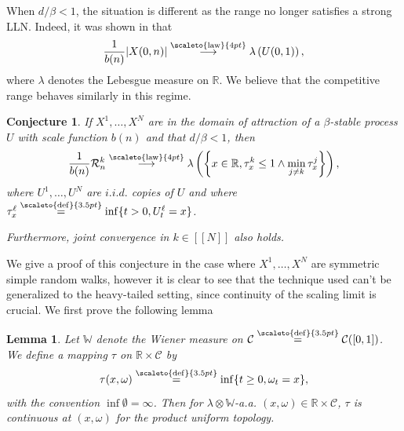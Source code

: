 \documentclass[12pt]{article}
\newcommand{\RR}{\mathbb R}
\newcommand{\R}{\mathcal R}
\newcommand{\1}{\mathds{1}}
\newcommand{\distribution}{\stackrel{\scaleto{\mathrm{law}}{4pt}}{\longrightarrow}}
\newcommand{\eqdef}{\stackrel{\scaleto{\mathrm{def}}{3.5pt}}{=}}
\newtheorem{lemma}{Lemma}
\newtheorem{conjecture}{Conjecture}
\numberwithin{equation}{section}
\begin{document}
When $d/\beta<1$, the situation is different as the range no longer satisfies a strong LLN. Indeed, it was shown in \cite{LeGallRosenRangeOfStableRandomWalks1991} that
\begin{equation*}
    \frac{1}{b(n)}|X(0,n)|\distribution\lambda\left(U(0,1)\right),
\end{equation*}
where $\lambda$ denotes the Lebesgue measure on $\RR$. We believe that the competitive range behaves similarly in this regime.
\begin{conjecture}
    If $X^1,\dots,X^N$ are in the domain of attraction of a $\beta$-stable process $U$ with scale function $b(n)$ and that $d/\beta<1$, then 
    \begin{equation*}
        \frac{1}{b(n)}\R_n^k\distribution\lambda\left(\left\{x\in\RR, \tau_x^k\le 1\wedge\min_{j\ne k}\tau_x^j\right\}\right),
    \end{equation*}
    where $U^1,\dots,U^N$ are $i.i.d.$ copies of $U$ and where $\tau_x^\ell\eqdef\inf\{t>0, U_t^\ell=x\}$.

    Furthermore, joint convergence in $k\in[\![N]\!]$ also holds.
\end{conjecture}
We give a proof of this conjecture in the case where $X^1,\dots,X^N$ are symmetric simple random walks, however it is clear to see that the technique used can't be generalized to the heavy-tailed setting, since continuity of the scaling limit is crucial. We first prove the following lemma 

\begin{lemma}
\label{lemma:joint continuity of Brownian hitting times}
    Let $\mathbb W$ denote the Wiener measure on $\mathcal C\eqdef\mathcal C([0,1])$. We define a mapping $\tau$ on $\RR\times\mathcal C$ by 
    \begin{equation*}
        \tau(x,\omega)\eqdef\inf\{t\ge0, \omega_t=x\},
    \end{equation*}
    with the convention $\inf\emptyset=\infty$. Then for  $\lambda\otimes\mathbb W$-a.a. $(x,\omega)\in\RR\times\mathcal C$, $\tau$ is continuous at $(x,\omega)$ for the product uniform topology.
\end{lemma}
\end{document}
